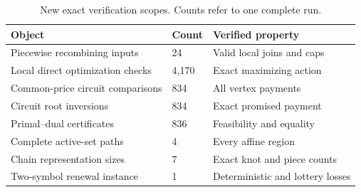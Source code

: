 \begin{table}[p]
\centering
\caption{New exact verification scopes. Counts refer to one complete run.}\label{tab:r33-verification}
\small
\begin{tabular}{p{}p{}p{}}
\toprule
Object & Count & Verified property\\
\midrule
Piecewise recombining inputs & 24 & Valid local joins and caps\\
Local direct optimization checks & 4,170 & Exact maximizing action\\
Common-price circuit comparisons & 834 & All vertex payments\\
Circuit root inversions & 834 & Exact promised payment\\
Primal--dual certificates & 836 & Feasibility and equality\\
Complete active-set paths & 4 & Every affine region\\
Chain representation sizes & 7 & Exact knot and piece counts\\
Two-symbol renewal instance & 1 & Deterministic and lottery losses\\
\bottomrule
\end{tabular}
\end{table}
